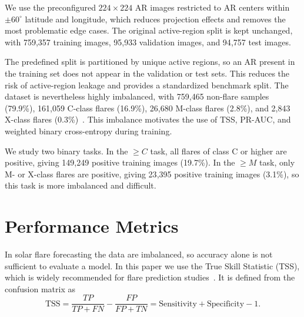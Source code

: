 \documentclass[runningheads]{llncs}
\begin{document}
We use the preconfigured $224 \times 224$ AR images restricted to AR centers within $\pm 60^\circ$ latitude and longitude, which reduces projection effects and removes the most problematic edge cases. The original active-region split is kept unchanged, with 759{,}357 training images, 95{,}933 validation images, and 94{,}757 test images.

The predefined split is partitioned by unique active regions, so an AR present in the training set does not appear in the validation or test sets. This reduces the risk of active-region leakage and provides a standardized benchmark split. The dataset is nevertheless highly imbalanced, with 759{,}465 non-flare samples (79.9\%), 161{,}059 C-class flares (16.9\%), 26{,}680 M-class flares (2.8\%), and 2{,}843 X-class flares (0.3\%)~\cite{ref_shao_review}. This imbalance motivates the use of TSS, PR-AUC, and weighted binary cross-entropy during training.

We study two binary tasks. In the $\geq C$ task, all flares of class C or higher are positive, giving 149{,}249 positive training images (19.7\%). In the $\geq M$ task, only M- or X-class flares are positive, giving 23{,}395 positive training images (3.1\%), so this task is more imbalanced and difficult.


\section{Performance Metrics}

In solar flare forecasting the data are imbalanced, so accuracy alone is not sufficient to evaluate a model. In this paper we use the True Skill Statistic (TSS), which is widely recommended for flare prediction studies~\cite{ref_bloomfield}. It is defined from the confusion matrix as
\begin{equation}
\mathrm{TSS} = \frac{TP}{TP + FN} - \frac{FP}{FP + TN} = \text{Sensitivity} + \text{Specificity} -1 .
\end{equation}
\end{document}
